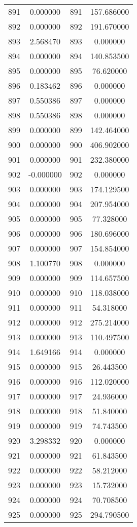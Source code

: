 \documentclass[12pt]{article}
\begin{document}
\begin{longtable}{@{}cccc@{}}
891 & 0.000000 & 891 & 157.686000 \\
892 & 0.000000 & 892 & 191.670000 \\
893 & 2.568470 & 893 & 0.000000 \\
894 & 0.000000 & 894 & 140.853500 \\
895 & 0.000000 & 895 & 76.620000 \\
896 & 0.183462 & 896 & 0.000000 \\
897 & 0.550386 & 897 & 0.000000 \\
898 & 0.550386 & 898 & 0.000000 \\
899 & 0.000000 & 899 & 142.464000 \\
900 & 0.000000 & 900 & 406.902000 \\
901 & 0.000000 & 901 & 232.380000 \\
902 & -0.000000 & 902 & 0.000000 \\
903 & 0.000000 & 903 & 174.129500 \\
904 & 0.000000 & 904 & 207.954000 \\
905 & 0.000000 & 905 & 77.328000 \\
906 & 0.000000 & 906 & 180.696000 \\
907 & 0.000000 & 907 & 154.854000 \\
908 & 1.100770 & 908 & 0.000000 \\
909 & 0.000000 & 909 & 114.657500 \\
910 & 0.000000 & 910 & 118.038000 \\
911 & 0.000000 & 911 & 54.318000 \\
912 & 0.000000 & 912 & 275.214000 \\
913 & 0.000000 & 913 & 110.497500 \\
914 & 1.649166 & 914 & 0.000000 \\
915 & 0.000000 & 915 & 26.443500 \\
916 & 0.000000 & 916 & 112.020000 \\
917 & 0.000000 & 917 & 24.936000 \\
918 & 0.000000 & 918 & 51.840000 \\
919 & 0.000000 & 919 & 74.743500 \\
920 & 3.298332 & 920 & 0.000000 \\
921 & 0.000000 & 921 & 61.843500 \\
922 & 0.000000 & 922 & 58.212000 \\
923 & 0.000000 & 923 & 15.732000 \\
924 & 0.000000 & 924 & 70.708500 \\
925 & 0.000000 & 925 & 294.790500 \\

\end{longtable}
\end{document}
